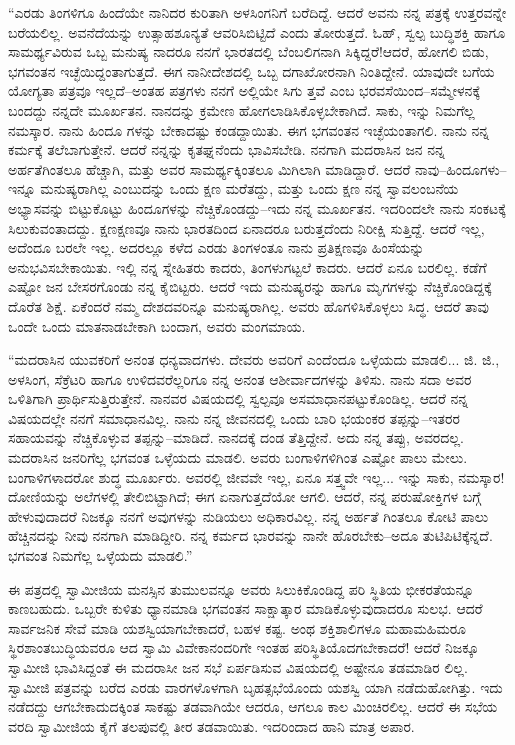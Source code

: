 “ಎರಡು ತಿಂಗಳಿಗೂ ಹಿಂದೆಯೇ ನಾನಿದರ ಕುರಿತಾಗಿ ಅಳಸಿಂಗನಿಗೆ ಬರೆದಿದ್ದೆ. ಆದರೆ ಅವನು ನನ್ನ ಪತ್ರಕ್ಕೆ ಉತ್ತರವನ್ನೇ ಬರೆಯಲಿಲ್ಲ. ಅವನೆದೆಯನ್ನು ಉತ್ಸಾಹಶೂನ್ಯತೆ ಆವರಿಸಿಬಿಟ್ಟಿದೆ ಎಂದು ತೋರುತ್ತದೆ. ಓಹ್, ಸ್ವಲ್ಪ ಬುದ್ಧಿಶಕ್ತಿ ಹಾಗೂ ಸಾಮರ್ಥ್ಯವಿರುವ ಒಬ್ಬ ಮನುಷ್ಯ ನಾದರೂ ನನಗೆ ಭಾರತದಲ್ಲಿ ಬೆಂಬಲಿಗನಾಗಿ ಸಿಕ್ಕಿದ್ದರೆ!ಆದರೆ, ಹೋಗಲಿ ಬಿಡು, ಭಗವಂತನ ಇಚ್ಛೆಯಿದ್ದಂತಾಗುತ್ತದೆ. ಈಗ ನಾನೀದೇಶದಲ್ಲಿ ಒಬ್ಬ ದಗಾಖೋರನಾಗಿ ನಿಂತಿದ್ದೇನೆ. ಯಾವುದೇ ಬಗೆಯ ಯೋಗ್ಯತಾ ಪತ್ರವೂ ಇಲ್ಲದೆ–ಅಂತಹ ಪತ್ರಗಳು ನನಗೆ ಅಲ್ಲಿಯೇ ಸಿಗು ತ್ತವೆ ಎಂಬ ಭರವಸೆಯಿಂದ–ಸಮ್ಮೇಳನಕ್ಕೆ ಬಂದದ್ದು ನನ್ನದೇ ಮೂರ್ಖತನ. ನಾನದನ್ನು ಕ್ರಮೇಣ ಹೋಗಲಾಡಿಸಿಕೊಳ್ಳಬೇಕಾಗಿದೆ. ಸಾಕು, ಇನ್ನು ನಿಮಗೆಲ್ಲ ನಮಸ್ಕಾರ. ನಾನು ಹಿಂದೂ ಗಳನ್ನು ಬೇಕಾದಷ್ಟು ಕಂಡದ್ದಾಯಿತು. ಈಗ ಭಗವಂತನ ಇಚ್ಛೆಯಂತಾಗಲಿ. ನಾನು ನನ್ನ ಕರ್ಮಕ್ಕೆ ತಲೆಬಾಗುತ್ತೇನೆ. ಆದರೆ ನನ್ನನ್ನು ಕೃತಘ್ನನೆಂದು ಭಾವಿಸಬೇಡಿ. ನನಗಾಗಿ ಮದರಾಸಿನ ಜನ ನನ್ನ ಅರ್ಹತೆಗಿಂತಲೂ ಹೆಚ್ಚಾಗಿ, ಮತ್ತು ಅವರ ಸಾಮರ್ಥ್ಯಕ್ಕಿಂತಲೂ ಮಿಗಿಲಾಗಿ ಮಾಡಿದ್ದಾರೆ. ಆದರೆ ನಾವು–ಹಿಂದೂಗಳು–ಇನ್ನೂ ಮನುಷ್ಯರಾಗಿಲ್ಲ ಎಂಬುದನ್ನು ಒಂದು ಕ್ಷಣ ಮರೆತದ್ದು, ಮತ್ತು ಒಂದು ಕ್ಷಣ ನನ್ನ ಸ್ವಾವಲಂಬನೆಯ ಅಭ್ಯಾಸವನ್ನು ಬಿಟ್ಟುಕೊಟ್ಟು ಹಿಂದೂಗಳನ್ನು ನೆಚ್ಚಿಕೊಂಡದ್ದು–ಇದು ನನ್ನ ಮೂರ್ಖತನ. ಇದರಿಂದಲೇ ನಾನು ಸಂಕಟಕ್ಕೆ ಸಿಲುಕುವಂತಾದದ್ದು. ಕ್ಷಣಕ್ಷಣವೂ ನಾನು ಭಾರತದಿಂದ ಏನಾದರೂ ಬರುತ್ತದೆಂದು ನಿರೀಕ್ಷಿ ಸುತ್ತಿದ್ದೆ. ಆದರೆ ಇಲ್ಲ, ಅದೆಂದೂ ಬರಲೇ ಇಲ್ಲ. ಅದರಲ್ಲೂ ಕಳೆದ ಎರಡು ತಿಂಗಳಂತೂ ನಾನು ಪ್ರತಿಕ್ಷಣವೂ ಹಿಂಸೆಯನ್ನು ಅನುಭವಿಸಬೇಕಾಯಿತು. ಇಲ್ಲಿ ನನ್ನ ಸ್ನೇಹಿತರು ಕಾದರು, ತಿಂಗಳುಗಟ್ಟಲೆ ಕಾದರು. ಆದರೆ ಏನೂ ಬರಲಿಲ್ಲ. ಕಡೆಗೆ ಎಷ್ಟೋ ಜನ ಬೇಸರಗೊಂಡು ನನ್ನ ಕೈಬಿಟ್ಟರು. ಆದರೆ ಇದು ಮನುಷ್ಯರನ್ನು ಹಾಗೂ ಮೃಗಗಳನ್ನು ನೆಚ್ಚಿಕೊಂಡಿದ್ದಕ್ಕೆ ದೊರೆತ ಶಿಕ್ಷೆ. ಏಕೆಂದರೆ ನಮ್ಮ ದೇಶದವರಿನ್ನೂ ಮನುಷ್ಯರಾಗಿಲ್ಲ. ಅವರು ಹೊಗಳಿಸಿಕೊಳ್ಳಲು ಸಿದ್ಧ. ಆದರೆ ತಾವು ಒಂದೇ ಒಂದು ಮಾತನಾಡಬೇಕಾಗಿ ಬಂದಾಗ, ಅವರು ಮಂಗಮಾಯ.

“ಮದರಾಸಿನ ಯುವಕರಿಗೆ ಅನಂತ ಧನ್ಯವಾದಗಳು. ದೇವರು ಅವರಿಗೆ ಎಂದೆಂದೂ ಒಳ್ಳೆಯದು ಮಾಡಲಿ... ಜಿ. ಜಿ., ಅಳಸಿಂಗ, ಸೆಕ್ರೆಟರಿ ಹಾಗೂ ಉಳಿದವರೆಲ್ಲರಿಗೂ ನನ್ನ ಅನಂತ ಆಶೀರ್ವಾದಗಳನ್ನು ತಿಳಿಸು. ನಾನು ಸದಾ ಅವರ ಒಳಿತಿಗಾಗಿ ಪ್ರಾರ್ಥಿಸುತ್ತಿರುತ್ತೇನೆ. ನಾನವರ ವಿಷಯದಲ್ಲಿ ಸ್ವಲ್ಪವೂ ಅಸಮಾಧಾನಪಟ್ಟುಕೊಂಡಿಲ್ಲ. ಆದರೆ ನನ್ನ ವಿಷಯದಲ್ಲೇ ನನಗೆ ಸಮಾಧಾನವಿಲ್ಲ. ನಾನು ನನ್ನ ಜೀವನದಲ್ಲಿ ಒಂದು ಬಾರಿ ಭಯಂಕರ ತಪ್ಪನ್ನು–ಇತರರ ಸಹಾಯವನ್ನು ನೆಚ್ಚಿಕೊಳ್ಳುವ ತಪ್ಪನ್ನು–ಮಾಡಿದೆ. ನಾನದಕ್ಕೆ ದಂಡ ತೆತ್ತಿದ್ದೇನೆ. ಅದು ನನ್ನ ತಪ್ಪು, ಅವರದಲ್ಲ. ಮದರಾಸಿನ ಜನರಿಗೆಲ್ಲ ಭಗವಂತ ಒಳ್ಳೆಯದು ಮಾಡಲಿ. ಅವರು ಬಂಗಾಳಿಗಳಿಗಿಂತ ಎಷ್ಟೋ ಪಾಲು ಮೇಲು. ಬಂಗಾಳಿಗಳಾದರೋ ಶುದ್ಧ ಮೂರ್ಖರು. ಅವರಲ್ಲಿ ಜೀವವೇ ಇಲ್ಲ, ಏನೂ ಸತ್ತ್ವವೇ ಇಲ್ಲ... ಇನ್ನು ಸಾಕು, ನಮಸ್ಕಾರ! ದೋಣಿಯನ್ನು ಅಲೆಗಳಲ್ಲಿ ತೇಲಿಬಿಟ್ಟಾಗಿದೆ; ಈಗ ಏನಾಗುತ್ತದೆಯೋ ಆಗಲಿ. ಆದರೆ, ನನ್ನ ಪರುಷೋಕ್ತಿಗಳ ಬಗ್ಗೆ ಹೇಳುವುದಾದರೆ ನಿಜಕ್ಕೂ ನನಗೆ ಅವುಗಳನ್ನು ನುಡಿಯಲು ಅಧಿಕಾರವಿಲ್ಲ. ನನ್ನ ಅರ್ಹತೆ ಗಿಂತಲೂ ಕೋಟಿ ಪಾಲು ಹೆಚ್ಚಿನದನ್ನು ನೀವು ನನಗಾಗಿ ಮಾಡಿದ್ದೀರಿ. ನನ್ನ ಕರ್ಮದ ಭಾರವನ್ನು ನಾನೇ ಹೊರಬೇಕು–ಅದೂ ತುಟಿಪಿಟಿಕ್ಕೆನ್ನದೆ. ಭಗವಂತ ನಿಮಗೆಲ್ಲ ಒಳ್ಳೆಯದು ಮಾಡಲಿ.”

ಈ ಪತ್ರದಲ್ಲಿ ಸ್ವಾಮೀಜಿಯ ಮನಸ್ಸಿನ ತುಮುಲವನ್ನೂ ಅವರು ಸಿಲುಕಿಕೊಂಡಿದ್ದ ಪರಿ ಸ್ಥಿತಿಯ ಭೀಕರತೆಯನ್ನೂ ಕಾಣಬಹುದು. ಒಬ್ಬರೇ ಕುಳಿತು ಧ್ಯಾನಮಾಡಿ ಭಗವಂತನ ಸಾಕ್ಷಾತ್ಕಾರ ಮಾಡಿಕೊಳ್ಳುವುದಾದರೂ ಸುಲಭ. ಆದರೆ ಸಾರ್ವಜನಿಕ ಸೇವೆ ಮಾಡಿ ಯಶಸ್ವಿಯಾಗಬೇಕಾದರೆ, ಬಹಳ ಕಷ್ಟ. ಅಂಥ ಶಕ್ತಿಶಾಲಿಗಳೂ ಮಹಾಮಹಿಮರೂ ಸ್ಥಿರಶಾಂತಬುದ್ಧಿಯವರೂ ಆದ ಸ್ವಾಮಿ ವಿವೇಕಾನಂದರಿಗೇ ಇಂತಹ ಪರಿಸ್ಥಿತಿಯೊದಗಬೇಕಾದರೆ! ಆದರೆ ನಿಜಕ್ಕೂ ಸ್ವಾಮೀಜಿ ಭಾವಿಸಿದ್ದಂತೆ ಈ ಮದರಾಸೀ ಜನ ಸಭೆ ಏರ್ಪಡಿಸುವ ವಿಷಯದಲ್ಲಿ ಅಷ್ಟೇನೂ ತಡಮಾಡಿರ ಲಿಲ್ಲ. ಸ್ವಾಮೀಜಿ ಪತ್ರವನ್ನು ಬರೆದ ಎರಡು ವಾರಗಳೊಳಗಾಗಿ ಬೃಹತ್ಸಭೆಯೊಂದು ಯಶಸ್ವಿ ಯಾಗಿ ನಡೆದುಹೋಗಿತ್ತು. ಇದು ನಡೆದದ್ದು ಆಗಬೇಕಾದುದಕ್ಕಿಂತ ಸಾಕಷ್ಟು ತಡವಾಗಿಯೇ ಆದರೂ, ಆಗಲೂ ಕಾಲ ಮಿಂಚಿರಲಿಲ್ಲ. ಆದರೆ ಈ ಸಭೆಯ ವರದಿ ಸ್ವಾಮೀಜಿಯ ಕೈಗೆ ತಲಪುವಲ್ಲಿ ತೀರ ತಡವಾಯಿತು. ಇದರಿಂದಾದ ಹಾನಿ ಮಾತ್ರ ಅಪಾರ.

